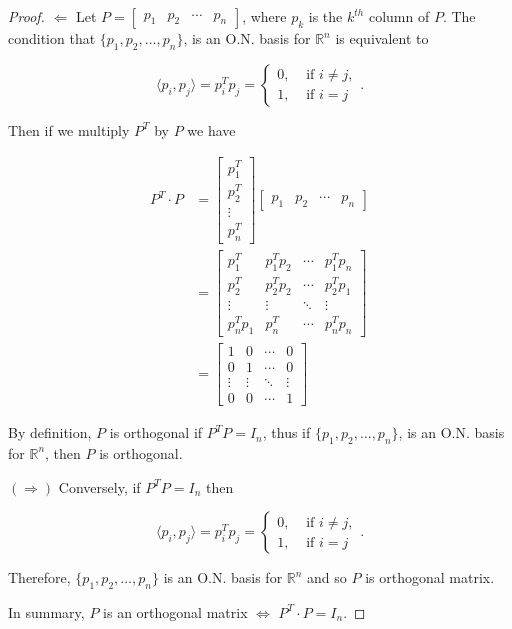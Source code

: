\documentclass[12pt]{article}
\theoremstyle{definition}
\begin{document}
\begin{proof}
$\Leftarrow$ Let $P = \begin{bmatrix} p_1 & p_2 & \cdots & p_n \end{bmatrix}$, where $p_k$ is the $k^{th}$
column of $P$. The condition that $\{p_1, p_2, \ldots, p_n\}$, is an O.N. basis for $\mathbb{R}^n$
is equivalent to 

\[\langle p_i, p_j \rangle = p_i^T p_j =
\begin{cases}
0, & \text{ if } i \neq j, \\
1, & \text{ if } i = j
\end{cases}.
\]

Then if we multiply $P^T$ by $P$ we have

\begin{align*}
P^T \cdot P &=
\begin{bmatrix}
p_1^T \\
p_2^T \\
\vdots \\
p_n^T
\end{bmatrix}
\begin{bmatrix}
p_1 & p_2 & \cdots & p_n
\end{bmatrix} \\
&=
\begin{bmatrix}
p_1^T & p_1^T p_2 & \cdots & p_1^T p_n \\
p_2^T & p_2^T p_2 & \cdots & p_2^T p_1 \\
\vdots & \vdots & \ddots & \vdots \\
p_n^T p_1 & p_n^T & \cdots & p_n^T p_n
\end{bmatrix} \\
&=
\begin{bmatrix}
1 & 0 & \cdots & 0 \\
0 & 1 & \cdots & 0 \\
\vdots & \vdots & \ddots & \vdots \\
0 & 0 & \cdots & 1
\end{bmatrix}
\end{align*}

By definition, $P$ is orthogonal if $P^TP = I_n$, thus if $\{p_1, p_2, \ldots, p_n\}$, 
is an O.N. basis for $\mathbb{R}^n$, then $P$ is orthogonal.

$(\Rightarrow)$ Conversely, if $P^TP = I_n$ then 

\[\langle p_i, p_j \rangle = p_i^T p_j =
\begin{cases}
0, & \text{ if } i \neq j, \\
1, & \text{ if } i = j
\end{cases}.
\]

Therefore, $\{p_1, p_2, \ldots, p_n\}$ is an O.N. basis for $\mathbb{R}^n$ and so
$P$ is orthogonal matrix.

In summary, $P$ is an orthogonal matrix $\iff$ $P^T \cdot P = I_n$.
\end{proof}
\end{document}

